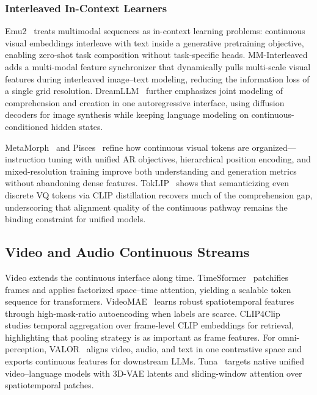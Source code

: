 \subsubsection{Interleaved In-Context Learners}
\label{subsubsec:interleaved}

Emu2~\cite{sun2024emu2} treats multimodal sequences as in-context learning problems: continuous visual embeddings interleave with text inside a generative pretraining objective, enabling zero-shot task composition without task-specific heads. MM-Interleaved~\cite{tian2024mminterleaved} adds a multi-modal feature synchronizer that dynamically pulls multi-scale visual features during interleaved image--text modeling, reducing the information loss of a single grid resolution. DreamLLM~\cite{dong2024dreamllm} further emphasizes joint modeling of comprehension and creation in one autoregressive interface, using diffusion decoders for image synthesis while keeping language modeling on continuous-conditioned hidden states.

MetaMorph~\cite{tong2025metamorph} and Pisces~\cite{xu2025pisces} refine how continuous visual tokens are organized---instruction tuning with unified AR objectives, hierarchical position encoding, and mixed-resolution training improve both understanding and generation metrics without abandoning dense features. TokLIP~\cite{lin2025toklip} shows that semanticizing even discrete VQ tokens via CLIP distillation recovers much of the comprehension gap, underscoring that alignment quality of the continuous pathway remains the binding constraint for unified models.

\subsection{Video and Audio Continuous Streams}
\label{subsec:video-audio}

Video extends the continuous interface along time. TimeSformer~\cite{bertasius2021timesformer} patchifies frames and applies factorized space--time attention, yielding a scalable token sequence for transformers. VideoMAE~\cite{tong2022videomae} learns robust spatiotemporal features through high-mask-ratio autoencoding when labels are scarce. CLIP4Clip~\cite{luo2022clip4clip} studies temporal aggregation over frame-level CLIP embeddings for retrieval, highlighting that pooling strategy is as important as frame features. For omni-perception, VALOR~\cite{liu2024valor} aligns video, audio, and text in one contrastive space and exports continuous features for downstream LLMs. Tuna~\cite{liu2025tuna} targets native unified video--language models with 3D-VAE latents and sliding-window attention over spatiotemporal patches.

